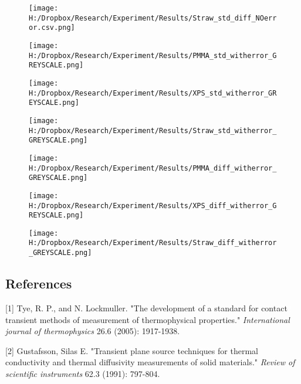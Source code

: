 \documentclass[]{article}
\begin{document}
\begin{figure}
\centering
\texttt{[image: H:/Dropbox/Research/Experiment/Results/Straw\_std\_diff\_NOerror.csv.png]}
\caption{}
\end{figure}

\begin{figure}
\centering
\texttt{[image: H:/Dropbox/Research/Experiment/Results/PMMA\_std\_witherror\_GREYSCALE.png]}
\caption{}
\end{figure}

\begin{figure}
\centering
\texttt{[image: H:/Dropbox/Research/Experiment/Results/XPS\_std\_witherror\_GREYSCALE.png]}
\caption{}
\end{figure}

\begin{figure}
\centering
\texttt{[image: H:/Dropbox/Research/Experiment/Results/Straw\_std\_witherror\_GREYSCALE.png]}
\caption{}
\end{figure}

\begin{figure}
\centering
\texttt{[image: H:/Dropbox/Research/Experiment/Results/PMMA\_diff\_witherror\_GREYSCALE.png]}
\caption{}
\end{figure}

\begin{figure}
\centering
\texttt{[image: H:/Dropbox/Research/Experiment/Results/XPS\_diff\_witherror\_GREYSCALE.png]}
\caption{}
\end{figure}

\begin{figure}
\centering
\texttt{[image: H:/Dropbox/Research/Experiment/Results/Straw\_diff\_witherror\_GREYSCALE.png]}
\caption{}
\end{figure}

\hypertarget{header-n152}{%
\subsection{References}\label{header-n152}}

{[}1{]} Tye, R. P., and N. Lockmuller. "The development of a standard
for contact transient methods of measurement of thermophysical
properties." \emph{International journal of thermophysics} 26.6 (2005):
1917-1938.

{[}2{]} Gustafsson, Silas E. "Transient plane source techniques for
thermal conductivity and thermal diffusivity measurements of solid
materials." \emph{Review of scientific instruments} 62.3 (1991):
797-804.
\end{document}
